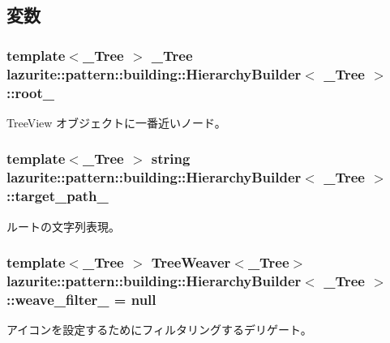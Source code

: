 \subsection{変数}
\hypertarget{classlazurite_1_1pattern_1_1building_1_1_hierarchy_builder_3_01___tree_01_4_a63792cc772647cdb88423ec306d86bf2}{
\subsubsection[{root\_\-}]{\setlength{\rightskip}{0pt plus 5cm}template$<$\_\-Tree $>$ \_\-Tree lazurite::pattern::building::HierarchyBuilder$<$ \_\-Tree $>$::{\bf root\_\-}}}
\label{classlazurite_1_1pattern_1_1building_1_1_hierarchy_builder_3_01___tree_01_4_a63792cc772647cdb88423ec306d86bf2}
TreeView オブジェクトに一番近いノード。 \hypertarget{classlazurite_1_1pattern_1_1building_1_1_hierarchy_builder_3_01___tree_01_4_ada0990fc059fbd69219012cbf946a83c}{
\subsubsection[{target\_\-path\_\-}]{\setlength{\rightskip}{0pt plus 5cm}template$<$\_\-Tree $>$ string lazurite::pattern::building::HierarchyBuilder$<$ \_\-Tree $>$::{\bf target\_\-path\_\-}}}
\label{classlazurite_1_1pattern_1_1building_1_1_hierarchy_builder_3_01___tree_01_4_ada0990fc059fbd69219012cbf946a83c}
ルートの文字列表現。 \hypertarget{classlazurite_1_1pattern_1_1building_1_1_hierarchy_builder_3_01___tree_01_4_a587334503ef9cb9cd3390f21d93feeb6}{
\subsubsection[{weave\_\-filter\_\-}]{\setlength{\rightskip}{0pt plus 5cm}template$<$\_\-Tree $>$ TreeWeaver$<$\_\-Tree$>$ lazurite::pattern::building::HierarchyBuilder$<$ \_\-Tree $>$::{\bf weave\_\-filter\_\-} = null}}
\label{classlazurite_1_1pattern_1_1building_1_1_hierarchy_builder_3_01___tree_01_4_a587334503ef9cb9cd3390f21d93feeb6}
アイコンを設定するためにフィルタリングするデリゲート。 


